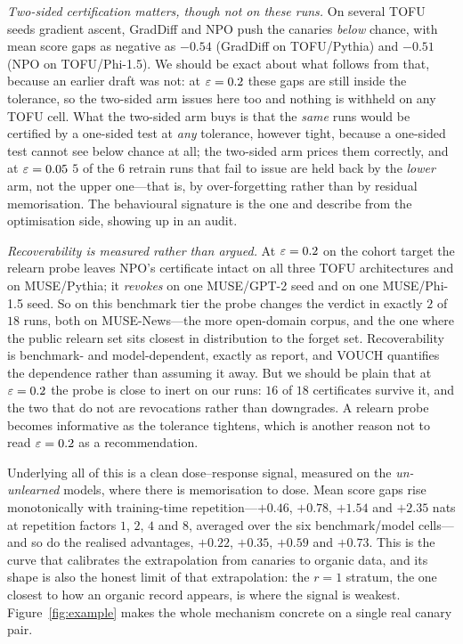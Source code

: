 \emph{Two-sided certification matters, though not on these runs.} On several TOFU
seeds gradient ascent, GradDiff and NPO push the canaries \emph{below} chance, with
mean score gaps as negative as $-0.54$ (GradDiff on TOFU/Pythia) and $-0.51$ (NPO on
TOFU/Phi-1.5). We should be exact about what follows from that, because an earlier
draft was not: at $\varepsilon = 0.2$ these gaps are still inside the tolerance, so the
two-sided arm issues here too and nothing is withheld on any TOFU cell. What the
two-sided arm buys is that the \emph{same} runs would be certified by a one-sided test
at \emph{any} tolerance, however tight, because a one-sided test cannot see below
chance at all; the two-sided arm prices them correctly, and at $\varepsilon = 0.05$ $5$ of
the $6$ retrain runs that fail to issue are held back by the \emph{lower} arm, not the
upper one---that is, by over-forgetting rather than by residual memorisation. The behavioural
signature is the one \citet{yuan2025closer} and \citet{li2026beliefs} describe from
the optimisation side, showing up in an audit.

\emph{Recoverability is measured rather than argued.} At $\varepsilon = 0.2$ on the cohort
target the relearn probe leaves NPO's certificate intact on all three TOFU
architectures and on MUSE/Pythia; it \emph{revokes} on one MUSE/GPT-2 seed and on one
MUSE/Phi-1.5 seed. So on this benchmark tier the probe changes the verdict in exactly
$2$ of $18$ runs, both on MUSE-News---the more open-domain corpus, and the one where
the public relearn set sits closest in distribution to the forget set. Recoverability
is benchmark- and model-dependent, exactly as \citet{hu2025jogging} report, and VOUCH
quantifies the dependence rather than assuming it away. But we should be plain that at
$\varepsilon = 0.2$ the probe is close to inert on our runs: $16$ of $18$ certificates
survive it, and the two that do not are revocations rather than downgrades. A relearn
probe becomes informative as the tolerance tightens, which is another reason not to
read $\varepsilon = 0.2$ as a recommendation.

Underlying all of this is a clean dose--response signal, measured on the
\emph{un-unlearned} models, where there is memorisation to dose. Mean score gaps rise
monotonically with training-time repetition---$+0.46$, $+0.78$, $+1.54$ and $+2.35$
nats at repetition factors $1$, $2$, $4$ and $8$, averaged over the six
benchmark/model cells---and so do the realised advantages, $+0.22$, $+0.35$, $+0.59$
and $+0.73$. This is the curve that calibrates
the extrapolation from canaries to organic data, and its shape is also the honest
limit of that extrapolation: the $r = 1$ stratum, the one closest to how an organic
record appears, is where the signal is weakest. Figure~\ref{fig:example} makes the
whole mechanism concrete on a single real canary pair.

